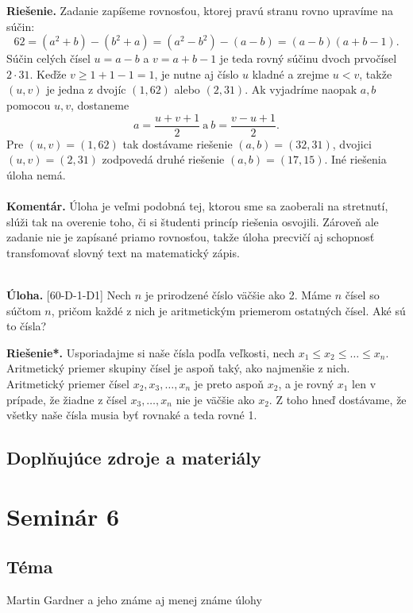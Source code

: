 \documentclass[11pt,a4paper,oneside,final]{book}
\newcommand{\kom}{\textbf{Komentár.} }
\newcommand{\ul}{\textbf{Úloha.} }
\newcommand{\rie}{\textbf{Riešenie.} }
\newcommand{\rieh}{\textbf{Riešenie*.} }
\begin{document}
\rie  Zadanie zapíšeme rovnosťou, ktorej pravú stranu rovno upravíme na súčin: $$62 = (a^2+ b) - (b^2
+ a) = (a^2 - b^2)- (a - b) = (a - b)(a + b - 1).$$
Súčin celých čísel $u = a - b$ a $v = a + b - 1$ je teda rovný súčinu dvoch prvočísel $2 \cdot 31$.
Keďže $v \geq 1 + 1 - 1 = 1$, je nutne aj číslo $u$ kladné a zrejme $u < v$, takže $(u, v)$ je jedna
z dvojíc $(1, 62)$ alebo $(2, 31)$. Ak vyjadríme naopak $a, b$ pomocou $u, v$, dostaneme $$a =\frac{u+v+1}{2} \ \textrm{a} \ b=\frac{v-u+1}{2}.$$ Pre $(u, v) = (1, 62)$ tak dostávame riešenie $(a, b) = (32, 31)$, dvojici $(u, v) = (2, 31)$ zodpovedá druhé riešenie $(a, b) = (17, 15)$. Iné riešenia úloha nemá.\\
\\
\kom Úloha je veľmi podobná tej, ktorou sme sa zaoberali na stretnutí, slúži tak na overenie toho, či si študenti princíp riešenia osvojili. Zároveň ale zadanie nie je zapísané priamo rovnosťou, takže úloha precvičí aj schopnosť transfomovať slovný text na matematický zápis.\\
\\
\begin{tcolorbox}[breakable,notitle,boxrule=0pt,colback=light-gray,colframe=light-gray]\ul [60-D-1-D1] Nech $n$ je prirodzené číslo väčšie ako 2. Máme $n$ čísel so súčtom $n$, pričom každé z nich je aritmetickým priemerom ostatných čísel. Aké sú to čísla?

\end{tcolorbox}

\rieh Usporiadajme si naše čísla podľa veľkosti, nech $x_1 \leq x_2 \leq \ldots \leq x_n$. Aritmetický priemer skupiny čísel je aspoň taký, ako najmenšie z nich. Aritmetický priemer čísel $x_2, x_3,\ldots , x_n$ je preto aspoň $x_2$, a je rovný $x_1$ len v prípade, že žiadne z čísel $x_3, \ldots , x_n$ nie je väčšie ako $x_2$. Z toho hneď dostávame, že všetky naše čísla musia byť rovnaké a teda rovné 1.
\subsection*{Doplňujúce zdroje a materiály}

\newpage
\section*{Seminár 6}
\subsection*{Téma}
Martin Gardner a jeho známe aj menej známe úlohy
\end{document}

